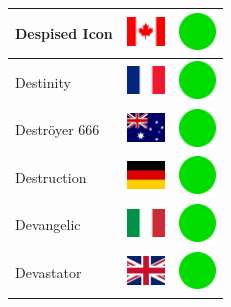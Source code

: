 \documentclass[12pt, a4paper, twoside]{report}
\begin{document}
\begin{center}
\begin{longtable}{|p{5cm}|p{2cm}|p{2cm}|}
 Despised Icon                                              & \includegraphics[width=1cm]{../img/flags/ca} &   \includegraphics[width=1cm]{../likes/y} \\ \hline
 Destinity                                                  & \includegraphics[width=1cm]{../img/flags/fr} &   \includegraphics[width=1cm]{../likes/y} \\ \hline
 Deströyer 666                                              & \includegraphics[width=1cm]{../img/flags/au} &   \includegraphics[width=1cm]{../likes/y} \\ \hline
 Destruction                                                & \includegraphics[width=1cm]{../img/flags/de} &   \includegraphics[width=1cm]{../likes/y} \\ \hline
 Devangelic                                                 & \includegraphics[width=1cm]{../img/flags/it} &   \includegraphics[width=1cm]{../likes/y} \\ \hline
 Devastator                                                 & \includegraphics[width=1cm]{../img/flags/gb} &   \includegraphics[width=1cm]{../likes/y} \\ \hline

\end{longtable}
\end{center}
\end{document}
